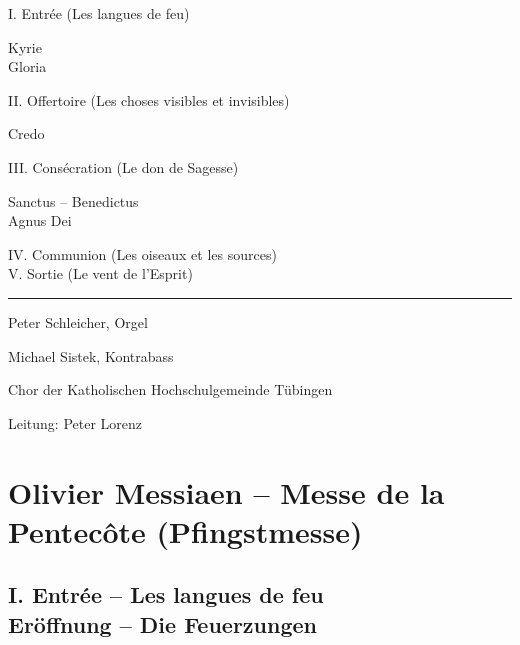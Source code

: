 \documentclass[a5paper,twoside,fontsize=10pt]{scrartcl}
\title{}
\author{}
\newcommand{\frenchandgermantitle}[2]{\subsection*{#1 \\#2}}
\begin{document}
%            
	    

\cleardoublepage

\begin{samepage}

I. Entrée (Les langues de feu)

Kyrie \\
Gloria

II. Offertoire (Les choses visibles et invisibles)

Credo

III. Consécration (Le don de Sagesse)

Sanctus -- Benedictus\\
Agnus Dei

IV. Communion (Les oiseaux et les sources) \\
V. Sortie (Le vent de l’Esprit)

\vfill

\par\noindent\rule{\textwidth}{0.4pt}

\begin{flushright}
Peter Schleicher, Orgel

Michael Sistek, Kontrabass

Chor der Katholischen Hochschulgemeinde Tübingen

Leitung: Peter Lorenz

\end{flushright}

\end{samepage}

\pagebreak

\section*{Olivier Messiaen – Messe de la Pentecôte (Pfingstmesse)}
\frenchandgermantitle{I. Entrée – Les langues de feu}{Eröffnung – Die Feuerzungen}
\end{document}
